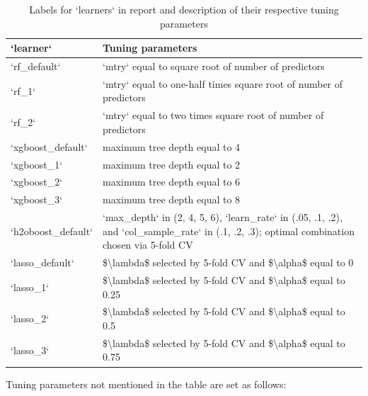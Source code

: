 \documentclass[
]{article}
\begin{document}
\begin{table}

\caption{\label{tab:learners}Labels for `learners` in report and description of their respective tuning parameters}
\centering
\begin{tabular}[t]{l|l}
\hline
`learner` & Tuning parameters\\
\hline
`rf\_default` & `mtry` equal to square root of number of predictors\\
\hline
`rf\_1` & `mtry` equal to one-half times square root of number of predictors\\
\hline
`rf\_2` & `mtry` equal to two times square root of number of predictors\\
\hline
`xgboost\_default` & maximum tree depth equal to 4\\
\hline
`xgboost\_1` & maximum tree depth equal to 2\\
\hline
`xgboost\_2` & maximum tree depth equal to 6\\
\hline
`xgboost\_3` & maximum tree depth equal to 8\\
\hline
`h2oboost\_default` & `max\_depth` in (2, 4, 5, 6), `learn\_rate` in (.05, .1, .2), and `col\_sample\_rate` in (.1, .2, .3); optimal combination chosen via 5-fold CV\\
\hline
`lasso\_default` & \$\textbackslash{}lambda\$ selected by 5-fold CV and \$\textbackslash{}alpha\$ equal to 0\\
\hline
`lasso\_1` & \$\textbackslash{}lambda\$ selected by 5-fold CV and \$\textbackslash{}alpha\$ equal to 0.25\\
\hline
`lasso\_2` & \$\textbackslash{}lambda\$ selected by 5-fold CV and \$\textbackslash{}alpha\$ equal to 0.5\\
\hline
`lasso\_3` & \$\textbackslash{}lambda\$ selected by 5-fold CV and \$\textbackslash{}alpha\$ equal to 0.75\\
\hline
\end{tabular}
\end{table}

Tuning parameters not mentioned in the table are set as follows:
\end{document}
